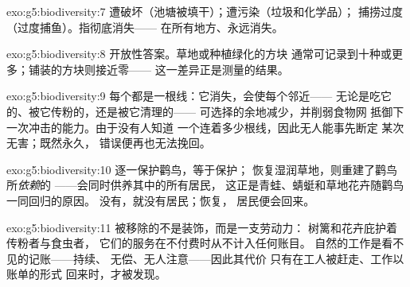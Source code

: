 \begin{solution}{exo:g5:biodiversity:7}
遭破坏（池塘被填干）；遭污染（垃圾和化学品）；
捕捞过度（过度捕鱼）。指彻底消失——
在所有地方、永远消失。
\end{solution}

\begin{solution}{exo:g5:biodiversity:8}
开放性答案。草地或种植绿化的方块
通常可记录到十种或更多；铺装的方块则接近零——
这一差异正是测量的结果。
\end{solution}

\begin{solution}{exo:g5:biodiversity:9}
每个都是一根线：它消失，会使每个邻近——
无论是吃它的、被它传粉的，还是被它清理的——
可选择的余地减少，并削弱食物网
抵御下一次冲击的能力。由于没有人知道
一个连着多少根线，因此无人能事先断定
某次无害；既然永久，
错误便再也无法挽回。
\end{solution}

\begin{solution}{exo:g5:biodiversity:10}
逐一保护鹳鸟，等于保护；
恢复湿润草地，则重建了鹳鸟所\emph{依赖}的
——会同时供养其中的所有居民，
这正是青蛙、蜻蜓和草地花卉随鹳鸟一同回归的原因。
没有，就没有居民；恢复，
居民便会回来。
\end{solution}

\begin{solution}{exo:g5:biodiversity:11}
被移除的不是装饰，而是一支劳动力：
树篱和花卉庇护着传粉者与食虫者，
它们的服务在不付费时从不计入任何账目。
自然的工作是看不见的记账——持续、
无偿、无人注意——因此其代价
只有在工人被赶走、工作以账单的形式
回来时，才被发现。
\end{solution}
